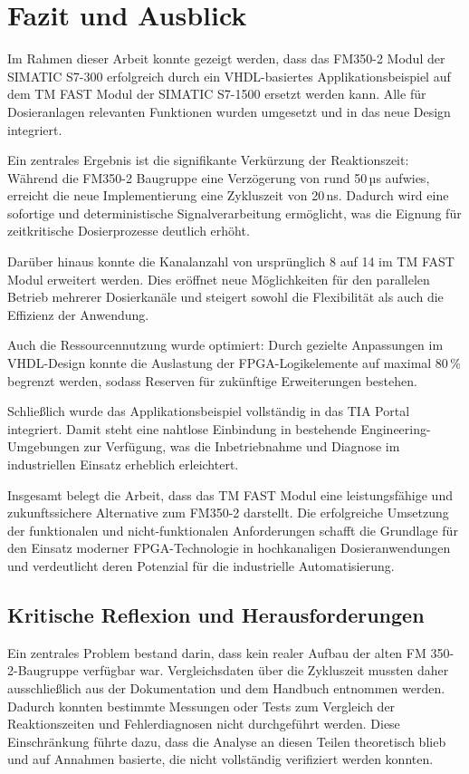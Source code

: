 \chapter{Fazit und Ausblick}
\label{chap:fazit}

Im Rahmen dieser Arbeit konnte gezeigt werden, dass das FM350-2 Modul der SIMATIC S7-300 erfolgreich durch ein VHDL-basiertes Applikationsbeispiel auf dem TM FAST Modul der SIMATIC S7-1500 ersetzt werden kann.  
Alle für Dosieranlagen relevanten Funktionen wurden umgesetzt und in das neue Design integriert.  

Ein zentrales Ergebnis ist die signifikante Verkürzung der Reaktionszeit: Während die FM350-2 Baugruppe eine Verzögerung von rund 50\,µs aufwies, erreicht die neue Implementierung eine Zykluszeit von 20\,ns. Dadurch wird eine sofortige und deterministische Signalverarbeitung ermöglicht, was die Eignung für zeitkritische Dosierprozesse deutlich erhöht.  

Darüber hinaus konnte die Kanalanzahl von ursprünglich 8 auf 14 im TM FAST Modul erweitert werden. Dies eröffnet neue Möglichkeiten für den parallelen Betrieb mehrerer Dosierkanäle und steigert sowohl die Flexibilität als auch die Effizienz der Anwendung.  

Auch die Ressourcennutzung wurde optimiert: Durch gezielte Anpassungen im VHDL-Design konnte die Auslastung der FPGA-Logikelemente auf maximal 80\,\% begrenzt werden, sodass Reserven für zukünftige Erweiterungen bestehen.  

Schließlich wurde das Applikationsbeispiel vollständig in das TIA Portal integriert. Damit steht eine nahtlose Einbindung in bestehende Engineering-Umgebungen zur Verfügung, was die Inbetriebnahme und Diagnose im industriellen Einsatz erheblich erleichtert.  

Insgesamt belegt die Arbeit, dass das TM FAST Modul eine leistungsfähige und zukunftssichere Alternative zum FM350-2 darstellt. Die erfolgreiche Umsetzung der funktionalen und nicht-funktionalen Anforderungen schafft die Grundlage für den Einsatz moderner FPGA-Technologie in hochkanaligen Dosieranwendungen und verdeutlicht deren Potenzial für die industrielle Automatisierung.

\section{Kritische Reflexion und Herausforderungen}

Ein zentrales Problem bestand darin, dass kein realer Aufbau der alten FM 350-2-Baugruppe verfügbar war. Vergleichsdaten über die Zykluszeit mussten daher ausschließlich aus der Dokumentation und dem Handbuch entnommen werden. Dadurch konnten bestimmte Messungen oder Tests zum Vergleich der Reaktionszeiten und Fehlerdiagnosen nicht durchgeführt werden. Diese Einschränkung führte dazu, dass die Analyse an diesen Teilen theoretisch blieb und auf Annahmen basierte, die nicht vollständig verifiziert werden konnten.  

